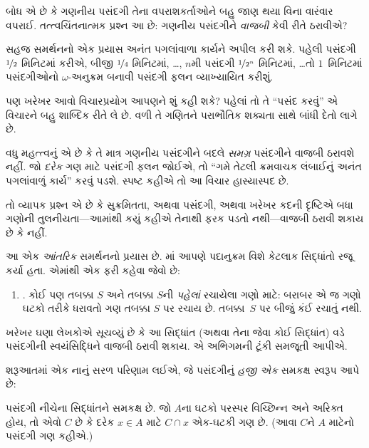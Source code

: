 બોધ એ છે કે ગણનીય પસંદગી તેના
વપરાશકર્તાઓને બહુ જાણ થયા વિના
વારંવાર વપરાઈ. તત્ત્વચિંતનાત્મક પ્રશ્ન
આ છે: ગણનીય પસંદગીને \emph{વાજબી}
કેવી રીતે ઠરાવીએ?

સહજ સમર્થનનો એક પ્રયાસ અનંત પગલાંવાળા
કાર્યને અપીલ કરી શકે. પહેલી પસંદગી
$\nicefrac{1}{2}$ મિનિટમાં કરીએ, બીજી
$\nicefrac{1}{4}$ મિનિટમાં, \dots,
$n$મી પસંદગી $\nicefrac{1}{2^n}$
મિનિટમાં, \dots\@ તો $1$~મિનિટમાં
પસંદગીઓનો $\omega$-અનુક્રમ બનાવી
પસંદગી ફલન વ્યાખ્યાયિત કરીશું.

પણ ખરેખર આવો વિચારપ્રયોગ આપણને
શું કહી શકે? પહેલાં તો તે ``પસંદ કરવું''
એ વિચારને બહુ શાબ્દિક રીતે લે છે.
વળી તે ગણિતને પરાભૌતિક શક્યતા
સાથે બાંધી દેતો લાગે છે.

વધુ મહત્ત્વનું એ છે કે તે માત્ર
ગણનીય પસંદગીને બદલે \emph{સમગ્ર}
પસંદગીને વાજબી ઠરાવશે નહીં. જો
\emph{દરેક} ગણ માટે પસંદગી ફલન
જોઈએ, તો ``ગમે તેટલી ક્રમવાચક
લંબાઈનું અનંત પગલાંવાળું કાર્ય''
કરવું પડશે. સ્પષ્ટ કહીએ તો આ
વિચાર હાસ્યાસ્પદ છે.
\endgroup

\begingroup
\makeatletter{}\makeatother

\label{guunit:OLP-0598}


તો વ્યાપક પ્રશ્ન એ છે કે સુક્રમિતતા,
અથવા પસંદગી, અથવા ખરેખર કદની દૃષ્ટિએ
બધા ગણોની તુલનીયતા---આમાંથી કયું
કહીએ તેનાથી ફરક પડતો નથી---વાજબી
ઠરાવી શકાય છે કે નહીં.

આ એક \emph{આંતરિક} સમર્થનનો પ્રયાસ છે.
માં આપણે પદાનુક્રમ
વિશે કેટલાક સિદ્ધાંતો રજૂ કર્યા હતા.
એમાંથી એક ફરી કહેવા જેવો છે:
\begin{enumerate}
	\item[] \stagesacc. કોઈ પણ તબક્કા $S$
	અને તબક્કા $S$ની \emph{પહેલાં} રચાયેલા
	ગણો માટે: બરાબર એ જ ગણો ઘટકો
	તરીકે ધરાવતો ગણ તબક્કા $S$ પર
	રચાય છે. તબક્કા~$S$ પર બીજું કંઈ
	રચાતું નથી.
\end{enumerate}
ખરેખર ઘણા લેખકોએ સૂચવ્યું છે કે
આ સિદ્ધાંત (અથવા તેના જેવા કોઈ
સિદ્ધાંત) વડે પસંદગીની સ્વયંસિદ્ધિને
વાજબી ઠરાવી શકાય. એ અભિગમની
ટૂંકી સમજૂતી આપીએ.

શરૂઆતમાં એક નાનું સરળ પરિણામ લઈએ,
જે પસંદગીનું \emph{હજી એક} સમકક્ષ
સ્વરૂપ આપે છે:

\begin{thm}[$\ZF$માં]
પસંદગી નીચેના સિદ્ધાંતને સમકક્ષ છે.
જો $A$ના ઘટકો પરસ્પર
વિચ્છિન્ન અને અરિક્ત હોય, તો એવો
$C$ છે કે દરેક $x \in A$ માટે
$C \cap x$ એક-ઘટકી ગણ છે.
(આવા $C$ને $A$ માટેનો
{પસંદગી ગણ} કહીએ.)
\end{thm}


